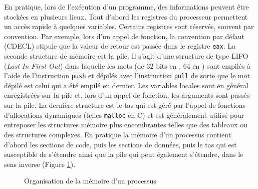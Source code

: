En pratique, lors de l'exécution d'un programme, des informations peuvent être stockées en plusieurs lieux. 
Tout d'abord les registres du processeur permettent un accès rapide à quelques variables.
Certains registres sont réservés, souvent par convention. Par exemple, lors d'un appel de fonction, la convention par défaut (CDECL) stipule que la valeur de retour est passée dans le registre \texttt{eax}.
La seconde structure de mémoire est la pile. 
Il s'agit d'une structure de type LIFO (\emph{Last In First Out}) dans laquelle les mots (de 32 bits en \xq, 64 en \xs) sont empilés à l'aide de l'instruction \texttt{push} et dépilés avec l'instruction \texttt{pull} de sorte que le mot dépilé est celui qui a été empilé en dernier.
Les variables locales sont en général enregistrées sur la pile et, lors d'un appel de fonction, les arguments sont passés sur la pile.
La dernière structure est le tas qui est géré par l'appel de fonctions d'allocations dynamiques (telles \texttt{malloc} en C) et est généralement utilisé pour entreposer les structures mémoire plus encombrantes telles que des tableaux ou des structures complexes.
En pratique la mémoire d'un processus contient d'abord les sections de code, puis les sections de données, puis le tas qui est susceptible de s'étendre ainsi que la pile qui peut également s'étendre, dans le sens inverse (Figure \ref{fig:mem_process}).

\begin{figure}[h]
\begin{center}
\end{center}
\caption{Organisation de la mémoire d'un processus}
\label{fig:mem_process}
\end{figure}



